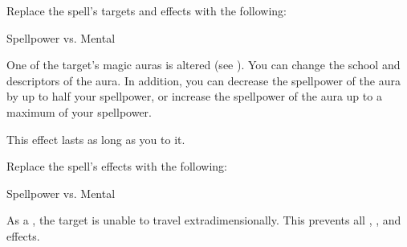 


Replace the spell's targets and effects with the following:
\begin{spellcontent}

\begin{augmenttargetinginfo}




\end{augmenttargetinginfo}


\begin{augmenteffects}




\begin{spellattack}{Spellpower vs. Mental}


\spellsuccess
One of the target's magic auras is altered (see ).
You can change the school and descriptors of the aura.
In addition, you can decrease the spellpower of the aura by up to half your spellpower, or increase the spellpower of the aura up to a maximum of your spellpower.

This effect lasts as long as you  to it.



\end{spellattack}





\end{augmenteffects}

\end{spellcontent}








Replace the spell's effects with the following:
\begin{spellcontent}

\begin{augmenteffects}




\begin{spellattack}{Spellpower vs. Mental}


\spellsuccess
As a , the target is unable to travel extradimensionally.
This prevents all , , and  effects.



\end{spellattack}





\end{augmenteffects}

\end{spellcontent}





